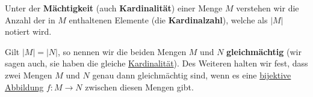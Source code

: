 \documentclass[../../main.tex]{subfiles}
\begin{document}
	\begin{definition}
		\label{def:Mächtigkeit}
		\label{def:Kardinalität}
		\label{def:Kardinalzahl}
		Unter der \textbf{Mächtigkeit} (auch \textbf{Kardinalität}) einer Menge $M$ verstehen wir die Anzahl der in $M$ enthaltenen Elemente (die \textbf{Kardinalzahl}), welche als $|M|$ notiert wird. 
	\end{definition}
	
	\begin{definition}[gleichmächtig]
		\label{def:gleichmächtig}
		Gilt $|M| = |N|$, so nennen wir die beiden Mengen $M$ und $N$ \textbf{gleichmächtig} (wir sagen auch, sie haben die gleiche \hyperref[def:Kardinalität]{Kardinalität}). Des Weiteren halten wir fest, dass zwei Mengen $M$ und $N$ genau dann gleichmächtig sind, wenn es eine \hyperref[def:Bijektiv]{bijektive} \hyperref[def:Abbildung]{Abbildung} $f: M \rightarrow N$ zwischen diesen Mengen gibt. 
	\end{definition}
	
\end{document}
